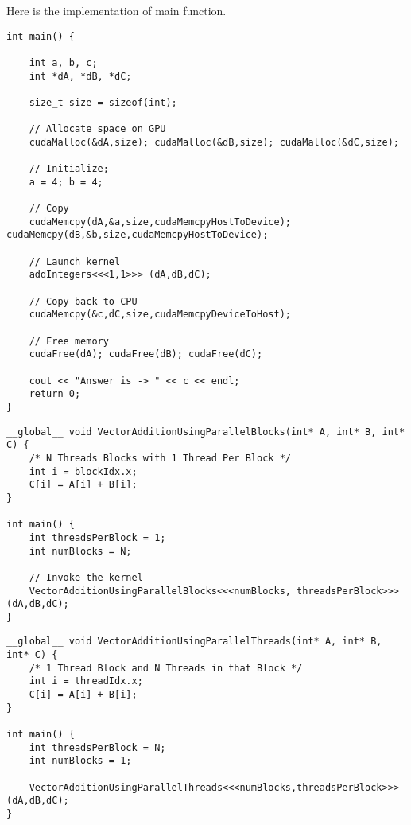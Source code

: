 Here is the implementation of main function.  
\begin{lstlisting}
int main() {
    
    int a, b, c;
    int *dA, *dB, *dC;

    size_t size = sizeof(int);

    // Allocate space on GPU
    cudaMalloc(&dA,size); cudaMalloc(&dB,size); cudaMalloc(&dC,size);

    // Initialize;
    a = 4; b = 4;

    // Copy
    cudaMemcpy(dA,&a,size,cudaMemcpyHostToDevice); cudaMemcpy(dB,&b,size,cudaMemcpyHostToDevice);

    // Launch kernel
    addIntegers<<<1,1>>> (dA,dB,dC);

    // Copy back to CPU
    cudaMemcpy(&c,dC,size,cudaMemcpyDeviceToHost);

    // Free memory
    cudaFree(dA); cudaFree(dB); cudaFree(dC);

    cout << "Answer is -> " << c << endl;
    return 0;
}
\end{lstlisting}

\newpage

\begin{lstlisting}
__global__ void VectorAdditionUsingParallelBlocks(int* A, int* B, int* C) {
    /* N Threads Blocks with 1 Thread Per Block */
    int i = blockIdx.x;
    C[i] = A[i] + B[i];
}

int main() {
    int threadsPerBlock = 1;
    int numBlocks = N;

    // Invoke the kernel
    VectorAdditionUsingParallelBlocks<<<numBlocks, threadsPerBlock>>> (dA,dB,dC);
}
\end{lstlisting}

\begin{lstlisting}
__global__ void VectorAdditionUsingParallelThreads(int* A, int* B, int* C) {
    /* 1 Thread Block and N Threads in that Block */
    int i = threadIdx.x;
    C[i] = A[i] + B[i];
}

int main() {
    int threadsPerBlock = N;
    int numBlocks = 1;

    VectorAdditionUsingParallelThreads<<<numBlocks,threadsPerBlock>>> (dA,dB,dC);
}
\end{lstlisting}


